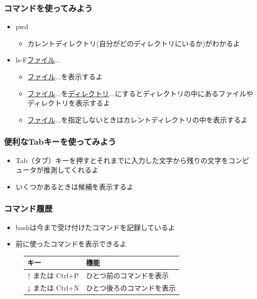 \documentclass[slide03.tex]{subfiles}
\begin{document}
\begin{frame}
    \frametitle{コマンドを使ってみよう}
    \begin{itemize}
        \item pwd
        \begin{itemize}
            \item カレントディレクトリ(自分がどのディレクトリにいるか)がわかるよ
        \end{itemize}
        \item ls\textvisiblespace -F\textvisiblespace\underline{ファイル}$\ldots$
        \begin{itemize}
            \item \underline{ファイル}$\ldots$を表示するよ
            \item \underline{ファイル}$\ldots$を\underline{ディレクトリ}$\ldots$にするとディレクトリの中にあるファイルやディレクトリを表示するよ
            \item \underline{ファイル}$\ldots$を指定しないときはカレントディレクトリの中を表示するよ
        \end{itemize}
    \end{itemize}
\end{frame}

\begin{frame}
    \frametitle{便利なTabキーを使ってみよう}
    \begin{itemize}
        \item Tab（タブ）キーを押すとそれまでに入力した文字から残りの文字をコンピュータが推測してくれるよ
        \item いくつかあるときは候補を表示するよ
    \end{itemize}
    \begin{figure}[h]
        \centering
        
    \end{figure}
\end{frame}

\begin{frame}
    \frametitle{コマンド履歴}
    \begin{itemize}
        \item bashは今まで受け付けたコマンドを記録しているよ
        \item 前に使ったコマンドを表示できるよ
    \end{itemize}
    \begin{figure}[h]
        \center
        \begin{tabular}{ll}\hline
          キー & 機能 \\ \hline
          ↑ または Ctrl+P & ひとつ前のコマンドを表示\\
          ↓ または Ctrl+N & ひとつ後ろのコマンドを表示\\ \hline
        \end{tabular}
    \end{figure}
\end{frame}
\end{document}
